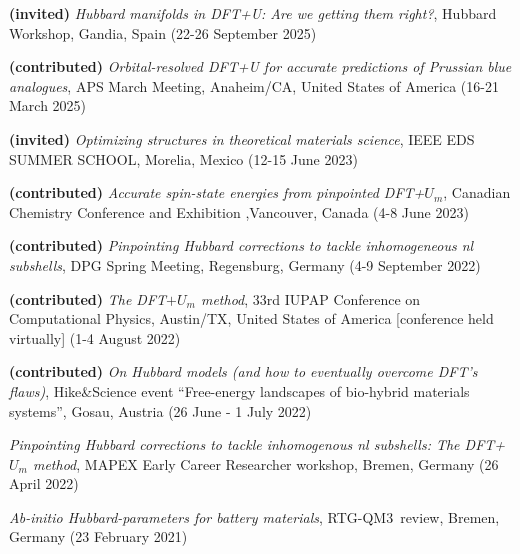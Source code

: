 \begin{etaremune}
    \item \textbf{(invited)} \textit{Hubbard manifolds in DFT+U: Are we getting them right?}, Hubbard Workshop, Gandia, Spain (22-26 September 2025)
    \item \textbf{(contributed)} \textit{Orbital-resolved DFT+U for accurate predictions of Prussian blue analogues}, APS March Meeting, Anaheim/CA, United States of America (16-21 March 2025)
    \item \textbf{(invited)} \textit{Optimizing structures in
    theoretical materials science}, IEEE EDS SUMMER SCHOOL, Morelia, Mexico (12-15 June 2023)
    \item \textbf{(contributed)} \textit{Accurate spin-state energies from pinpointed DFT+$U_m$}, Canadian Chemistry Conference and Exhibition ,Vancouver, Canada (4-8 June 2023)
    \item \textbf{(contributed)} \textit{Pinpointing Hubbard corrections to tackle inhomogeneous nl subshells}, DPG Spring Meeting, Regensburg, Germany (4-9 September 2022)
    \item \textbf{(contributed)} \textit{The DFT$+U_m$ method}, 33rd IUPAP Conference on Computational Physics, Austin/TX, United States of America [conference held virtually] (1-4 August 2022)
    \item \textbf{(contributed)} \textit{On Hubbard models (and how to eventually overcome DFT’s flaws)}, Hike\&Science event ``Free-energy landscapes of bio-hybrid materials systems'', Gosau, Austria (26 June - 1 July 2022)
\end{etaremune}

\begin{etaremune}
    \item \textit{Pinpointing Hubbard corrections to tackle inhomogenous nl subshells: The DFT+$U_m$ method}, MAPEX Early Career Researcher workshop, Bremen, Germany (26 April 2022)
    \item \textit{Ab-initio Hubbard-parameters for battery materials}, RTG-QM3~review, Bremen, Germany (23 February 2021)
\end{etaremune}


